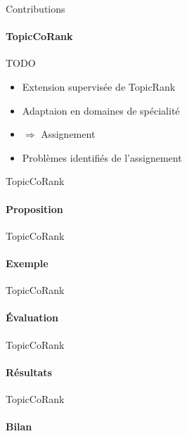 \begin{frame}{Contributions}\framesubtitle{TopicCoRank}
  \begin{alertblock}{TODO}
    \begin{itemize}
      \item{Extension supervisée de TopicRank}
      \item{Adaptaion en domaines de spécialité}
      \item{$\Rightarrow$ Assignement}
      \item{Problèmes identifiés de l'assignement}
    \end{itemize}
  \end{alertblock}
\end{frame}

\begin{frame}{TopicCoRank}\framesubtitle{Proposition}
\end{frame}

\begin{frame}{TopicCoRank}\framesubtitle{Exemple}
\end{frame}

\begin{frame}{TopicCoRank}\framesubtitle{Évaluation}
\end{frame}

\begin{frame}{TopicCoRank}\framesubtitle{Résultats}
\end{frame}

\begin{frame}{TopicCoRank}\framesubtitle{Bilan}
\end{frame}

